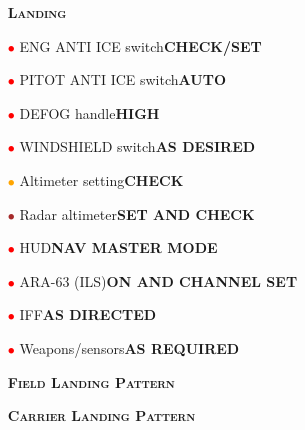\documentclass[a4paper,12pt,dvipsnames]{letter}
\newcommand{\button}[1]{\textbf{#1}}
\newcommand{\myHead}[1]{{\LARGE\textsc{\textbf{#1}}}}
\newcommand{\ri}{\textcolor{Red}{$\bullet$\;}}
\newcommand{\oi}{\textcolor{Orange}{$\bullet$\;}}
\renewcommand{\ni}{\textcolor{Brown}{$\bullet$\;}}
\begin{document}
{\vspace{0.5em}
\begin{itemize}
 \item[] \myHead{Landing}
 \item[\ri] ENG ANTI ICE switch\dotfill\button{CHECK/SET}
 \item[\ri] PITOT ANTI ICE switch\dotfill\button{AUTO}
 \item[\ri] DEFOG handle\dotfill\button{HIGH}
 \item[\ri] WINDSHIELD switch\dotfill\button{AS DESIRED}
 \item[\oi] Altimeter setting\dotfill\button{CHECK}
 \item[\ni] Radar altimeter\dotfill\button{SET AND CHECK}
 \item[\ri] HUD\dotfill\button{NAV MASTER MODE}
 \item[\ri] ARA-63 (ILS)\dotfill\button{ON AND CHANNEL SET}
 \item[\ri] IFF\dotfill\button{AS DIRECTED}
 \item[\ri] Weapons/sensors\dotfill\button{AS REQUIRED}
\end{itemize}
\newpage
\begin{itemize}
 \item[] \myHead{Field Landing Pattern}
\end{itemize}
\newpage
\begin{itemize}
 \item[] \myHead{Carrier Landing Pattern}
\end{itemize} 
%
}
\end{document}
